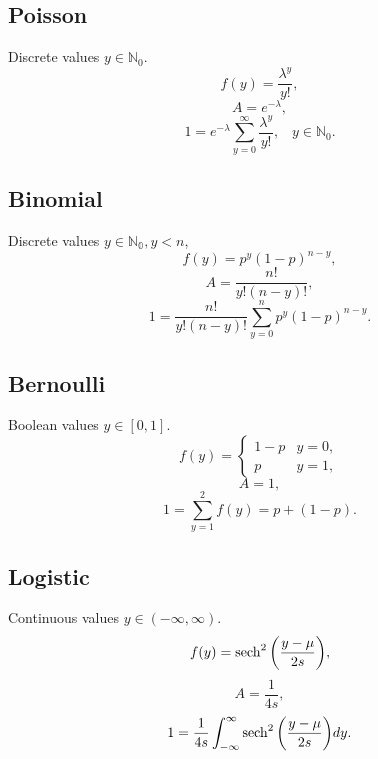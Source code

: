 \documentclass[11pt]{article}
\begin{document}
\subsection{Poisson}
Discrete values $y\in\mathbb{N}_0$.
\begin{equation}
f(y) = \frac{\lambda^y}{y!},
\end{equation}
\begin{equation}
A = e^{-\lambda},
\end{equation}
\begin{equation}
1 = e^{-\lambda}\sum_{y=0}^\infty  \frac{\lambda^y}{y!},\hspace{10pt}y\in\mathbb{N}_0.
\end{equation}

\subsection{Binomial}
Discrete values $y\in\mathbb{N_0},y<n$,
\begin{equation}
f(y)=p^y(1-p)^{n-y},
\end{equation}
\begin{equation}
A=\frac{n!}{y!(n-y)!},
\end{equation}
\begin{equation}
1=\frac{n!}{y!(n-y)!}\sum_{y=0}^n p^y(1-p)^{n-y}.
\end{equation}

\subsection{Bernoulli}
Boolean values $y\in[0,1]$.
\begin{equation}
f(y)=\left\{
  \begin{array}{lr}
    1-p & y=0,\\
    p & y=1,
  \end{array}
\right.
\end{equation}
\begin{equation}
A=1,
\end{equation}
\begin{equation}
1 = \sum_{y=1}^2 f(y) = p + (1-p).
\end{equation}

\subsection{Logistic}
Continuous values $y\in(-\infty,\infty)$.
\begin{equation} %
f(y) =\sech^2\qty(\frac{y-\mu}{2s}),
\end{equation}
\begin{equation}
A=\frac{1}{4s},
\end{equation}
\begin{equation}
1=\frac{1}{4s}\int_{-\infty}^\infty \sech^2\qty(\frac{y-\mu}{2s}) dy.
\end{equation}
\end{document}
